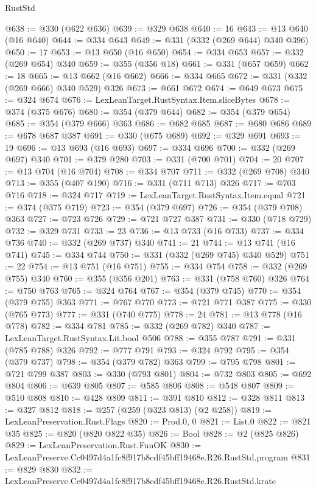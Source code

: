 \begin{lexlean}{RustStd}
\begin{coremodule}
@638 := @330 (@622 @636)
@639 := @329 @638
@640 := 16
@643 := @13 @640 (@16 @640)
@644 := @334 @643
@649 := @331 (@332 (@269 @644) @340 @396)
@650 := 17
@653 := @13 @650 (@16 @650)
@654 := @334 @653
@657 := @332 (@269 @654) @340
@659 := @355 (@356 @18)
@661 := @331 (@657 @659)
@662 := 18
@665 := @13 @662 (@16 @662)
@666 := @334 @665
@672 := @331 (@332 (@269 @666) @340 @529) @326
@673 := @661 @672
@674 := @649 @673
@675 := @324 @674
@676 := LexLeanTarget.RustSyntax.Item.sliceBytes
@678 := @374 (@375 @676)
@680 := @354 (@379 @644)
@682 := @354 (@379 @654)
@685 := @354 (@379 @666) @363
@686 := @682 @685
@687 := @680 @686
@689 := @678 @687 @387
@691 := @330 (@675 @689)
@692 := @329 @691
@693 := 19
@696 := @13 @693 (@16 @693)
@697 := @334 @696
@700 := @332 (@269 @697) @340
@701 := @379 @280
@703 := @331 (@700 @701)
@704 := 20
@707 := @13 @704 (@16 @704)
@708 := @334 @707
@711 := @332 (@269 @708) @340
@713 := @355 (@407 @190)
@716 := @331 (@711 @713) @326
@717 := @703 @716
@718 := @324 @717
@719 := LexLeanTarget.RustSyntax.Item.equal
@721 := @374 (@375 @719)
@723 := @354 (@379 @697)
@726 := @354 (@379 @708) @363
@727 := @723 @726
@729 := @721 @727 @387
@731 := @330 (@718 @729)
@732 := @329 @731
@733 := 23
@736 := @13 @733 (@16 @733)
@737 := @334 @736
@740 := @332 (@269 @737) @340
@741 := 21
@744 := @13 @741 (@16 @741)
@745 := @334 @744
@750 := @331 (@332 (@269 @745) @340 @529)
@751 := 22
@754 := @13 @751 (@16 @751)
@755 := @334 @754
@758 := @332 (@269 @755) @340
@760 := @355 (@356 @201)
@763 := @331 (@758 @760) @326
@764 := @750 @763
@765 := @324 @764
@767 := @354 (@379 @745)
@770 := @354 (@379 @755) @363
@771 := @767 @770
@773 := @721 @771 @387
@775 := @330 (@765 @773)
@777 := @331 (@740 @775)
@778 := 24
@781 := @13 @778 (@16 @778)
@782 := @334 @781
@785 := @332 (@269 @782) @340
@787 := LexLeanTarget.RustSyntax.Lit.bool @506
@788 := @355 @787
@791 := @331 (@785 @788) @326
@792 := @777 @791
@793 := @324 @792
@795 := @354 (@379 @737)
@798 := @354 (@379 @782) @363
@799 := @795 @798
@801 := @721 @799 @387
@803 := @330 (@793 @801)
@804 := @732 @803
@805 := @692 @804
@806 := @639 @805
@807 := @585 @806
@808 := @548 @807
@809 := @510 @808
@810 := @428 @809
@811 := @391 @810
@812 := @328 @811
@813 := @327 @812
@818 := @257 (@259 (@323 @813) (@2 @258))
@819 := LexLeanPreservation.Rust.Flags
@820 := Prod.{0, 0}
@821 := List.{0}
@822 := @821 @35
@825 := @820 (@820 @822 @35)
@826 := Bool
@828 := @2 (@825 @826)
@829 := LexLeanPreservation.Rust.FunOK
@830 := LexLeanPreserve.Cc0497d4a1fc8f917b8cdf45bff19468e.R26.RustStd.program
@831 := @829 @830
@832 := LexLeanPreserve.Cc0497d4a1fc8f917b8cdf45bff19468e.R26.RustStd.krate

\end{coremodule}
\end{lexlean}
